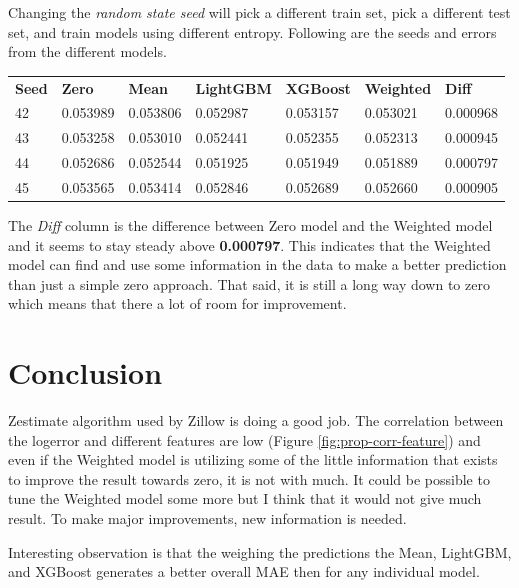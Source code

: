 \documentclass[a4paper]{article}
\begin{document}
Changing the \textit{random state seed} will pick a different train set, pick a different test set, and train models using different entropy. Following are the seeds and errors from the different models.
\begin{center}
\begin{tabular}{ l l l l l l l }
    \textbf{Seed} & \textbf{Zero} & \textbf{Mean} & \textbf{LightGBM} & \textbf{XGBoost} & \textbf{Weighted} & \textbf{Diff} \\
    42 & 0.053989 & 0.053806 & 0.052987 & 0.053157 & 0.053021 & 0.000968 \\
    43 & 0.053258 & 0.053010 & 0.052441 & 0.052355 & 0.052313 & 0.000945 \\
    44 & 0.052686 & 0.052544 & 0.051925 & 0.051949 & 0.051889 & 0.000797 \\
    45 & 0.053565 & 0.053414 & 0.052846 & 0.052689 & 0.052660 & 0.000905 \\
\end{tabular}
\end{center}
The \textit{Diff} column is the difference between Zero model and the Weighted model and it seems to stay steady above \textbf{0.000797}. This indicates that the Weighted model can find and use some information in the data to make a better prediction than just a simple zero approach. That said, it is still a long way down to zero which means that there a lot of room for improvement.

\section{Conclusion}
Zestimate algorithm used by Zillow is doing a good job. The correlation between the logerror and
different features are low (Figure \ref{fig:prop-corr-feature}) and even if the Weighted model is utilizing some of the little information that exists to improve the result towards zero, it is not with much. It could be possible to tune the Weighted model some more but I think that it would not give much result. To make major improvements, new information is needed.

Interesting observation is that the weighing the predictions the Mean, LightGBM, and XGBoost generates a better overall MAE then for any individual model.


\end{document}

